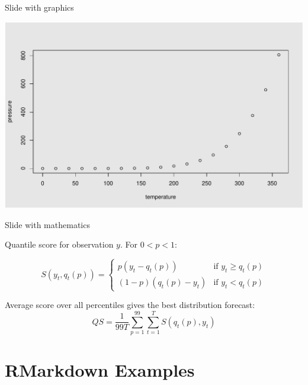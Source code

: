 \documentclass[14pt,ignorenonframetext,compress]{beamer}
\begin{document}
\begin{frame}{Slide with graphics}
\protect\hypertarget{slide-with-graphics}{}

\includegraphics{beamer_template_monash_files/figure-beamer/pressure-1.pdf}

\end{frame}

\begin{frame}{Slide with mathematics}
\protect\hypertarget{slide-with-mathematics}{}

Quantile score for observation \(y\). For \(0<p<1\):

\begin{block}{}
  \[
    S(y_t,q_t(p)) = \left\{
      \begin{array}{rl}
            p(y_t-q_t(p)) & \text{if $y_t \ge q_t(p)$}\\
        (1-p)(q_t(p)-y_t) & \text{if $y_t < q_t(p)$}
      \end{array}\right.
  \]
\end{block}

Average score over all percentiles gives the best distribution forecast:
\[
  QS = \frac{1}{99T}\sum_{p=1}^{99}\sum_{t=1}^T S(q_t(p),y_t)
\]

\end{frame}

\hypertarget{rmarkdown-examples}{%
\section{RMarkdown Examples}\label{rmarkdown-examples}}
\end{document}
